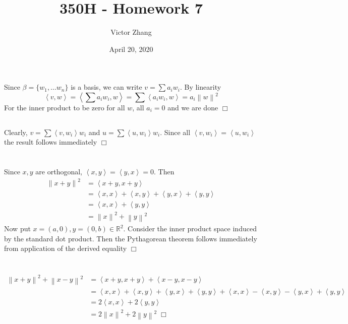 \documentclass{article}
\title{350H - Homework 7}
\author{Victor Zhang}
\date{April 20, 2020}
\newcommand{\innerprod}[2]{\left\langle #1 , #2 \right\rangle}
\newcommand{\norm}[1]{\left\lVert#1\right\rVert}
\begin{document}
\maketitle

\section{}
\subsection{}
Since $\beta = \{ w_1, \dots w_n \}$ is a basis, we can write $v = \sum a_iw_i$. By linearity
$$\innerprod{v}{w} = \innerprod{\sum a_iw_i}{w} = \sum \innerprod{a_iw_i}{w} = a_i \norm{w}^2$$
For the inner product to be zero for all $w$, all $a_i = 0$ and we are done $\Box$
\subsection{}
Clearly, $v = \sum \innerprod{v}{w_i}w_i$ and $u = \sum \innerprod{u}{w_i}w_i$. Since all $\innerprod{v}{w_i} = \innerprod{u}{w_i}$ the result follows immediately $\Box$

\section{}
Since $x,y$ are orthogonal, $\innerprod{x}{y} = \innerprod{y}{x} = 0$. Then
\begin{equation*}
\begin{split}
\norm{x+y}^2 &= \innerprod{x+y}{x+y}\\
&= \innerprod{x}{x} + \innerprod{x}{y} + \innerprod{y}{x} + \innerprod{y}{y}\\
&= \innerprod{x}{x} + \innerprod{y}{y}\\
&= \norm{x}^2 + \norm{y}^2
\end{split}
\end{equation*}
Now put $x = (a,0), y = (0,b) \in \mathbb{R}^2$. Consider the inner product space induced by the standard dot product. Then the Pythagorean theorem follows immediately from application of the derived equality $\Box$

\section{}
\begin{equation*}
\begin{split}
\norm{x+y}^2 + \norm{x-y}^2 &= \innerprod{x+y}{x+y} + \innerprod{x-y}{x-y}\\
&= \innerprod{x}{x} + \innerprod{x}{y} + \innerprod{y}{x} + \innerprod{y}{y} + \innerprod{x}{x} - \innerprod{x}{y} - \innerprod{y}{x} + \innerprod{y}{y}\\
&= 2\innerprod{x}{x} + 2\innerprod{y}{y}\\
&= 2\norm{x}^2 + 2\norm{y}^2 \; \Box
\end{split}
\end{equation*}
\end{document}
